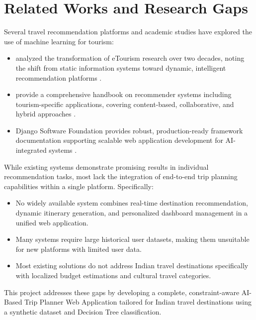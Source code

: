 \section{Related Works and Research Gaps}

Several travel recommendation platforms and academic studies have explored the use of machine learning for tourism:

\begin{itemize}
    \item \citeauthor{buhalis2008} analyzed the transformation of eTourism research over two decades, noting the shift from static information systems toward dynamic, intelligent recommendation platforms \cite{buhalis2008}.
    \item \citeauthor{ricci2015} provide a comprehensive handbook on recommender systems including tourism-specific applications, covering content-based, collaborative, and hybrid approaches \cite{ricci2015}.
    \item Django Software Foundation provides robust, production-ready framework documentation supporting scalable web application development for AI-integrated systems \cite{django2026}.
\end{itemize}

While existing systems demonstrate promising results in individual recommendation tasks, most lack the integration of end-to-end trip planning capabilities within a single platform. Specifically:

\begin{itemize}
    \item No widely available system combines real-time destination recommendation, dynamic itinerary generation, and personalized dashboard management in a unified web application.
    \item Many systems require large historical user datasets, making them unsuitable for new platforms with limited user data.
    \item Most existing solutions do not address Indian travel destinations specifically with localized budget estimations and cultural travel categories.
\end{itemize}

This project addresses these gaps by developing a complete, constraint-aware AI-Based Trip Planner Web Application tailored for Indian travel destinations using a synthetic dataset and Decision Tree classification.
